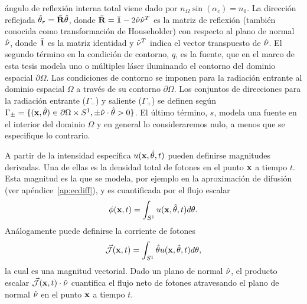 ángulo de reflexión interna total viene dado por $n_{\Omega} \sin(\alpha_c)=n_0$.
La dirección reflejada $\hat{\theta}_r=\bar{\mathbf{R}} \hat{\theta}$, donde $\bar{\mathbf{R}} =\bar{\mathbf{1}}-2\hat{\nu} \hat{\nu}^T$ es la matriz de reflexión 
(también conocida como transformación de Householder) con respecto al plano de normal $\hat{\nu}$, donde $\bar{\mathbf{1}}$ 
es la matriz identidad y $\hat{\nu}^T$ 
indica el vector transpuesto de $\hat{\nu}$.   El 
segundo término en la condición de contorno, $q$, es la fuente, que en el marco de esta tesis 
modela uno o múltiples láser iluminando el contorno del dominio espacial $\partial \Omega$. 
Las condiciones de contorno se imponen para la radiación entrante 
al dominio espacial $\Omega$ a través de su contorno $\partial \Omega$. 
Los conjuntos de direcciones para la radiación entrante ($\Gamma_-$) y saliente ($\Gamma_+$) 
se definen según $\Gamma_{\pm}=\{(\mathbf{x},\hat{\theta}) \in \partial \Omega \times S^1, 
\pm \hat \nu \cdot \hat{\theta} >0 \}$. 
El último término, $s$, modela una fuente en el interior 
del dominio $\Omega$ y en general lo consideraremos nulo, a menos 
que se especifique lo contrario. 

A partir de la intensidad específica $u(\mathbf{x},\hat{\theta},t)$ pueden definirse magnitudes derivadas. 
Una de ellas es la densidad total de fotones 
en el punto $\mathbf{x}$ a tiempo $t$. Esta magnitud es la que se modela, por ejemplo
en la aproximación de difusión (ver apéndice~\ref{ap:ecdiff}), y es cuantificada por el flujo escalar
\begin{equation}
  \phi(\mathbf{x},t)=\int_{S^1} u(\mathbf{x},\hat{\theta},t) d\theta.
\label{eq:photondensity}
\end{equation}
Análogamente puede definirse la corriente de fotones 
\begin{equation}
 \vec{ \mathcal{J}}(\mathbf{x},t)=\int_{S^1} \hat{\theta} u(\mathbf{x},\hat{\theta},t) d\theta,
\label{eq:photoncurrent}
\end{equation}
la cual es una magnitud vectorial. Dado un plano de normal $\hat{\nu}$, 
el producto escalar $\vec{ \mathcal{J}}(\mathbf{x},t) \cdot \hat{\nu}$ 
cuantifica el flujo neto de fotones atravesando el plano de normal $ \hat{\nu}$ 
en el punto $\mathbf{x}$ a tiempo $t$.

